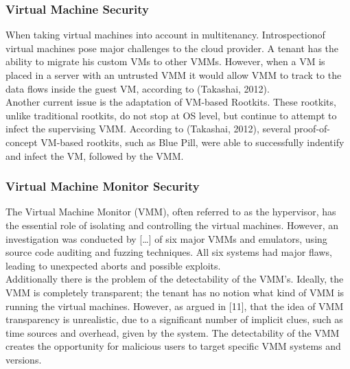 \subsubsection{Virtual Machine Security}
When taking virtual machines into account in multitenancy. Introspectionof virtual machines pose major challenges to the cloud provider. A tenant has the ability to migrate his custom VMs to other VMMs. However, when a VM is placed in a server with an untrusted VMM it would allow VMM to track to the data flows inside the guest VM, according to (Takashai, 2012). \\
Another current issue is the adaptation of VM-based Rootkits. These rootkits, unlike traditional rootkits, do not stop at OS level, but continue to attempt to infect the supervising VMM. According to (Takashai, 2012), several proof-of-concept VM-based rootkits, such as Blue Pill, were able to successfully indentify and infect the VM, followed by the VMM.\\

\subsubsection{Virtual Machine Monitor Security}
The Virtual Machine Monitor (VMM), often referred to as the hypervisor, has the essential role of isolating and controlling the virtual machines. However, an investigation was conducted by […] of six major VMMs and emulators, using source code auditing and fuzzing techniques. All six systems had major flaws, leading to unexpected aborts and possible exploits.\\
Additionally there is the problem of the detectability of the VMM’s. Ideally, the VMM is completely transparent; the tenant has no notion what kind of VMM is running the virtual machines. However, as argued in [11], that the idea of VMM transparency is unrealistic, due to a significant number of implicit clues, such as time sources and overhead, given by the system. The detectability of the VMM creates the opportunity for malicious users to target specific VMM systems and versions.\\

